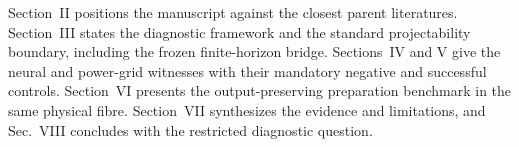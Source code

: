 Section~II positions the manuscript against the closest parent literatures. Section~III states the diagnostic framework and the standard projectability boundary, including the frozen finite-horizon bridge. Sections~IV and V give the neural and power-grid witnesses with their mandatory negative and successful controls. Section~VI presents the output-preserving preparation benchmark in the same physical fibre. Section~VII synthesizes the evidence and limitations, and Sec.~VIII concludes with the restricted diagnostic question.


